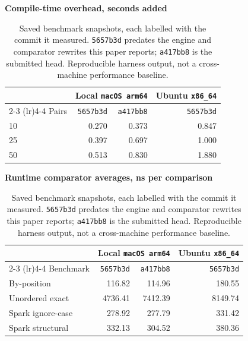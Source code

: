 \begin{table}[t]
  \caption{Saved benchmark snapshots, each labelled with the commit it measured. \texttt{5657b3d} predates the engine and comparator rewrites this paper reports; \texttt{a417bb8} is the submitted head. Reproducible harness output, not a cross-machine performance baseline.}
  \label{tab:benchmarks}
  \centering
  \scriptsize
  \textbf{Compile-time overhead, seconds added}

  \begin{tabular}{lrrr}
    \toprule
          & \multicolumn{2}{c}{Local \texttt{macOS arm64}} & Ubuntu \texttt{x86\_64} \\
    \cmidrule(lr){2-3} \cmidrule(lr){4-4}
    Pairs & \texttt{5657b3d} & \texttt{a417bb8} & \texttt{5657b3d} \\
    \midrule
    10 & 0.270 & 0.373 & 0.847 \\
    25 & 0.397 & 0.697 & 1.000 \\
    50 & 0.513 & 0.830 & 1.880 \\
    \bottomrule
  \end{tabular}

  \vspace{0.6em}
  \textbf{Runtime comparator averages, ns per comparison}

  \begin{tabular}{lrrr}
    \toprule
              & \multicolumn{2}{c}{Local \texttt{macOS arm64}} & Ubuntu \texttt{x86\_64} \\
    \cmidrule(lr){2-3} \cmidrule(lr){4-4}
    Benchmark & \texttt{5657b3d} & \texttt{a417bb8} & \texttt{5657b3d} \\
    \midrule
    By-position & 116.82 & 114.96 & 180.55 \\
    Unordered exact & 4736.41 & 7412.39 & 8149.74 \\
    Spark ignore-case & 278.92 & 277.79 & 331.42 \\
    Spark structural & 332.13 & 304.52 & 380.36 \\
    \bottomrule
  \end{tabular}
\end{table}

